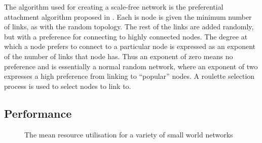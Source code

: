 The algorithm used for creating a scale-free network is the preferential
attachment algorithm proposed in \cite{net-barabasi99-scaling}. Each is node is
given the minimum number of links, as with the random topology. The rest of the
links are added randomly, but with a preference for connecting to highly
connected nodes. The degree at which a node prefers to connect to a particular
node is expressed as an exponent of the number of links that node has. Thus an
exponent of zero means no preference and is essentially a normal random
network, where an exponent of two expresses a high preference from linking to
``popular'' nodes. A roulette selection process is used to select nodes to link
to.



\subsection{Performance}

\begin{figure}[h] 
  \centering
  \caption{The mean resource utilisation for a variety of small world networks}
  \label{FIG:RES:SWRUTIL}
\end{figure}

